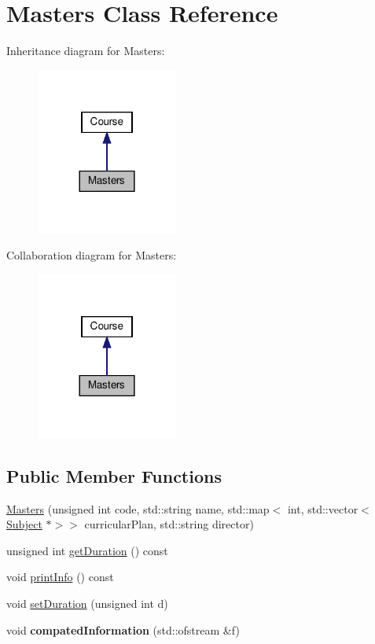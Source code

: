 \hypertarget{classMasters}{}\section{Masters Class Reference}
\label{classMasters}


Inheritance diagram for Masters\+:\nopagebreak
\begin{figure}[H]
\begin{center}
\leavevmode
\includegraphics[width=132pt]{classMasters__inherit__graph}
\end{center}
\end{figure}


Collaboration diagram for Masters\+:\nopagebreak
\begin{figure}[H]
\begin{center}
\leavevmode
\includegraphics[width=132pt]{classMasters__coll__graph}
\end{center}
\end{figure}
\subsection*{Public Member Functions}
\begin{DoxyCompactItemize}
\item 
\hyperlink{classMasters_a37bef5483363064f8253ac2532e44904}{Masters} (unsigned int code, std\+::string name, std\+::map$<$ int, std\+::vector$<$ \hyperlink{classSubject}{Subject} $\ast$$>$$>$ curricular\+Plan, std\+::string director)
\item 
unsigned int \hyperlink{classMasters_a1ce9d04336172b5ea01e0fc397329f7c}{get\+Duration} () const
\item 
void \hyperlink{classMasters_a72034d4ad86c3d62c755ad04228d09da}{print\+Info} () const
\item 
void \hyperlink{classMasters_af80b6665ac5a0f5fb189da1fd636b0fb}{set\+Duration} (unsigned int d)
\item 
\mbox{\label{classMasters_a2e3fe30a654585e98ade65c560f80238}} 
void {\bfseries compated\+Information} (std\+::ofstream \&f)
\end{DoxyCompactItemize}
